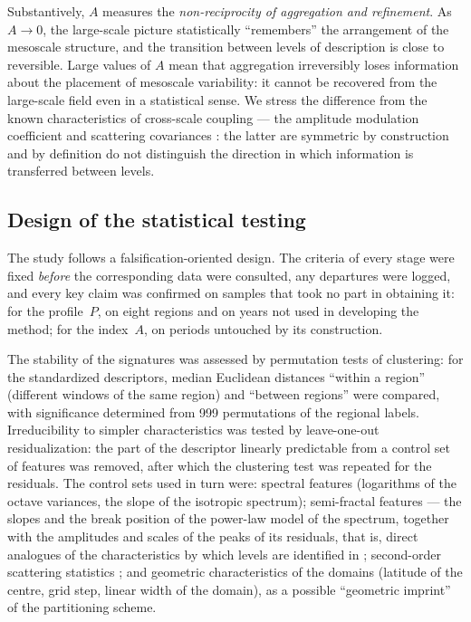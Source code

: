 \documentclass[11pt,a4paper]{article}
\begin{document}
Substantively, $A$ measures the \emph{non-reciprocity of aggregation and refinement}. As $A\to0$, the large-scale picture statistically ``remembers'' the arrangement of the mesoscale structure, and the transition between levels of description is close to reversible. Large values of $A$ mean that aggregation irreversibly loses information about the placement of mesoscale variability: it cannot be recovered from the large-scale field even in a statistical sense. We stress the difference from the known characteristics of cross-scale coupling --- the amplitude modulation coefficient \cite{Mathis2009} and scattering covariances \cite{Cheng2024}: the latter are symmetric by construction and by definition do not distinguish the direction in which information is transferred between levels.

\subsection{Design of the statistical testing}

The study follows a falsification-oriented design. The criteria of every stage were fixed \emph{before} the corresponding data were consulted, any departures were logged, and every key claim was confirmed on samples that took no part in obtaining it: for the profile~$P$, on eight regions and on years not used in developing the method; for the index~$A$, on periods untouched by its construction.

The stability of the signatures was assessed by permutation tests of clustering: for the standardized descriptors, median Euclidean distances ``within a region'' (different windows of the same region) and ``between regions'' were compared, with significance determined from 999 permutations of the regional labels. Irreducibility to simpler characteristics was tested by leave-one-out residualization: the part of the descriptor linearly predictable from a control set of features was removed, after which the clustering test was repeated for the residuals. The control sets used in turn were: spectral features (logarithms of the octave variances, the slope of the isotropic spectrum); semi-fractal features --- the slopes and the break position of the power-law model of the spectrum, together with the amplitudes and scales of the peaks of its residuals, that is, direct analogues of the characteristics by which levels are identified in \cite{Krenke2019}; second-order scattering statistics \cite{Cheng2024}; and geometric characteristics of the domains (latitude of the centre, grid step, linear width of the domain), as a possible ``geometric imprint'' of the partitioning scheme.
\end{document}
